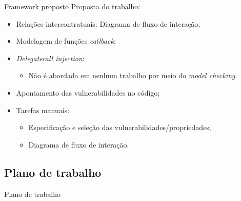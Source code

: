 \begin{frame}{Framework proposto}
	Proposta do trabalho:
	\begin{itemize}
		\item Relações intercontratuais: Diagrama de fluxo de interação;
		\item Modelagem de funções \textit{callback};
		\item \textit{Delegatecall injection}:
		\begin{itemize}
			\item Não é abordada em nenhum trabalho por meio do \textit{model checking}.
		\end{itemize}
		\item Apontamento das vulnerabilidades no código;
		\item Tarefas manuais:
		\begin{itemize}
			\item Especificação e seleção das vulnerabilidades/propriedades;
			\item Diagrama de fluxo de interação.
		\end{itemize}
	\end{itemize}
\end{frame}

\subsection{Plano de trabalho}
\begin{frame}{Plano de trabalho}
    
\end{frame}
